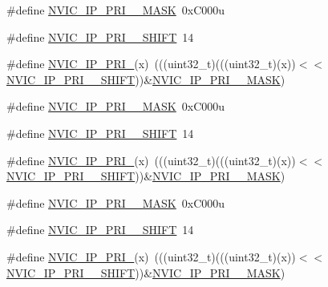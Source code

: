 \begin{DoxyCompactItemize}
\item 
\#define \hyperlink{group___n_v_i_c___register___masks_ga96377193746acdc9f77fef1aa939d7e8}{N\+V\+I\+C\+\_\+\+I\+P\+\_\+\+P\+R\+I\+\_\+\_\+\+M\+A\+SK}~0x\+C000u
\item 
\#define \hyperlink{group___n_v_i_c___register___masks_ga3f0d1e7120ac37c4a4b926c8d770f3bf}{N\+V\+I\+C\+\_\+\+I\+P\+\_\+\+P\+R\+I\+\_\+\_\+\+S\+H\+I\+FT}~14
\item 
\#define \hyperlink{group___n_v_i_c___register___masks_ga291878c83b67a7100c72831522641ee2}{N\+V\+I\+C\+\_\+\+I\+P\+\_\+\+P\+R\+I\+\_}(x)~(((uint32\+\_\+t)(((uint32\+\_\+t)(x))$<$$<$\hyperlink{group___n_v_i_c___register___masks_ga3f0d1e7120ac37c4a4b926c8d770f3bf}{N\+V\+I\+C\+\_\+\+I\+P\+\_\+\+P\+R\+I\+\_\+\_\+\+S\+H\+I\+FT}))\&\hyperlink{group___n_v_i_c___register___masks_ga96377193746acdc9f77fef1aa939d7e8}{N\+V\+I\+C\+\_\+\+I\+P\+\_\+\+P\+R\+I\+\_\+\_\+\+M\+A\+SK})
\item 
\#define \hyperlink{group___n_v_i_c___register___masks_ga259260406aa11f2b8002e534df7b795e}{N\+V\+I\+C\+\_\+\+I\+P\+\_\+\+P\+R\+I\+\_\+\_\+\+M\+A\+SK}~0x\+C000u
\item 
\#define \hyperlink{group___n_v_i_c___register___masks_gabe52ee1ab77a911455477981fc660657}{N\+V\+I\+C\+\_\+\+I\+P\+\_\+\+P\+R\+I\+\_\+\_\+\+S\+H\+I\+FT}~14
\item 
\#define \hyperlink{group___n_v_i_c___register___masks_gab11f938f689915485f648d5eb660fc95}{N\+V\+I\+C\+\_\+\+I\+P\+\_\+\+P\+R\+I\+\_}(x)~(((uint32\+\_\+t)(((uint32\+\_\+t)(x))$<$$<$\hyperlink{group___n_v_i_c___register___masks_gabe52ee1ab77a911455477981fc660657}{N\+V\+I\+C\+\_\+\+I\+P\+\_\+\+P\+R\+I\+\_\+\_\+\+S\+H\+I\+FT}))\&\hyperlink{group___n_v_i_c___register___masks_ga259260406aa11f2b8002e534df7b795e}{N\+V\+I\+C\+\_\+\+I\+P\+\_\+\+P\+R\+I\+\_\+\_\+\+M\+A\+SK})
\item 
\#define \hyperlink{group___n_v_i_c___register___masks_ga814cd4772457cb9ecbbca3e920fd137e}{N\+V\+I\+C\+\_\+\+I\+P\+\_\+\+P\+R\+I\+\_\+\_\+\+M\+A\+SK}~0x\+C000u
\item 
\#define \hyperlink{group___n_v_i_c___register___masks_ga04e4114079b0bdec123a9ec1cbf753ac}{N\+V\+I\+C\+\_\+\+I\+P\+\_\+\+P\+R\+I\+\_\+\_\+\+S\+H\+I\+FT}~14
\item 
\#define \hyperlink{group___n_v_i_c___register___masks_ga48db3154d51edebe377f4b418387ff0e}{N\+V\+I\+C\+\_\+\+I\+P\+\_\+\+P\+R\+I\+\_}(x)~(((uint32\+\_\+t)(((uint32\+\_\+t)(x))$<$$<$\hyperlink{group___n_v_i_c___register___masks_ga04e4114079b0bdec123a9ec1cbf753ac}{N\+V\+I\+C\+\_\+\+I\+P\+\_\+\+P\+R\+I\+\_\+\_\+\+S\+H\+I\+FT}))\&\hyperlink{group___n_v_i_c___register___masks_ga814cd4772457cb9ecbbca3e920fd137e}{N\+V\+I\+C\+\_\+\+I\+P\+\_\+\+P\+R\+I\+\_\+\_\+\+M\+A\+SK})
$$
\end{DoxyCompactItemize}
